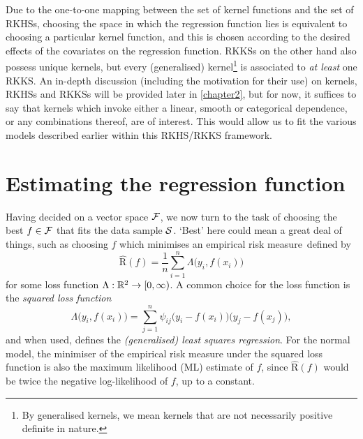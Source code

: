 \documentclass[11pt,twoside,openright,showframe]{report}
\begin{document}
Due to the one-to-one mapping between the set of kernel functions and the set of RKHSs, choosing the space in which the regression function lies is equivalent to choosing a particular kernel function, and this is chosen according to the desired effects of the covariates on the regression function.
RKKSs on the other hand also possess unique kernels, but every (generalised) kernel\footnote{By generalised kernels, we mean kernels that are not necessarily positive definite in nature.} is associated to \emph{at least} one RKKS.
An in-depth discussion (including the motivation for their use) on kernels, RKHSs and RKKSs will be provided later in \cref{chapter2}, but for now, it suffices to say that kernels which invoke either a linear, smooth or categorical dependence, or any combinations thereof, are of interest.
This would allow us to fit the various models described earlier within this RKHS/RKKS framework.

\section{Estimating the regression function}

Having decided on a vector space ${\mathcal F}$, we now turn to the task of choosing the best $f \in {\mathcal F}$ that fits the data sample ${\mathcal S}$.
`Best' here could mean a great deal of things, such as choosing $f$ which minimises an empirical risk measure\footnotemark~defined by
\begin{equation*}
  \hat{\text{R}}(f) = \frac{1}{n} \sum_{i=1}^n \Lambda\big( y_i, f(x_i) \big) 
\end{equation*}
for some loss function $\Lambda:\mathbb{R}^2 \to [0,\infty)$.
A common choice for the loss function is the \emph{squared loss function}
\[
  \Lambda\big(y_i,f(x_i)\big) = \sum_{j=1}^n \psi_{ij} \big(y_i - f(x_i)\big)\big(y_j - f(x_j)\big),
\]
and when used, defines the \emph{(generalised) least squares regression}.
For the normal model, the minimiser of the empirical risk measure under the squared loss function is also the maximum likelihood (ML) estimate of $f$, since $ \hat{\text{R}}(f)$ would be twice the negative log-likelihood of $f$, up to a constant.

\end{document}

